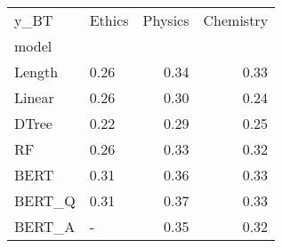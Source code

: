 \begin{tabular}{llrr}
\toprule
y\_BT & Ethics &  Physics &  Chemistry \\
model  &        &          &            \\
\midrule
Length &   0.26 &     0.34 &       0.33 \\
Linear &   0.26 &     0.30 &       0.24 \\
DTree  &   0.22 &     0.29 &       0.25 \\
RF     &   0.26 &     0.33 &       0.32 \\
BERT   &   0.31 &     0.36 &       0.33 \\
BERT\_Q &   0.31 &     0.37 &       0.33 \\
BERT\_A &      - &     0.35 &       0.32 \\
\bottomrule
\end{tabular}

